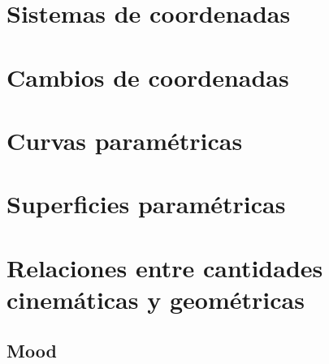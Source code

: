 \documentclass[12pt]{article}
\begin{document}
\section*{Sistemas de coordenadas}

\section*{Cambios de coordenadas}

\section*{Curvas paramétricas}

\section*{Superficies paramétricas}

\section*{Relaciones entre cantidades cinemáticas y geométricas}

\subsection*{Mood}
\end{document}
